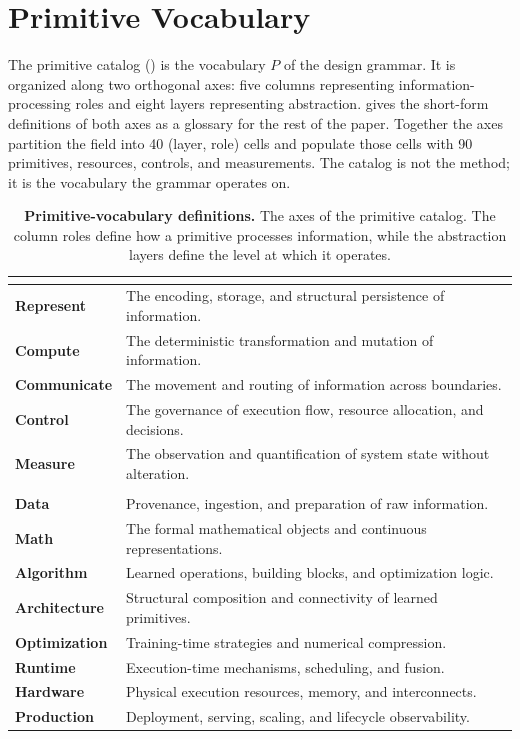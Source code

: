\documentclass[10pt,twocolumn]{article}
\newcommand{\tablebody}{\footnotesize}
\begin{document}
\section{Primitive Vocabulary}
\label{sec:primitive-vocabulary}

The primitive catalog () is the vocabulary $P$ of the design grammar. It is organized along two orthogonal axes: five columns representing information-processing roles and eight layers representing abstraction.  gives the short-form definitions of both axes as a glossary for the rest of the paper. Together the axes partition the field into 40 (layer, role) cells and populate those cells with 90 primitives, resources, controls, and measurements. The catalog is not the method; it is the vocabulary the grammar operates on.

\begin{table}[ht]
\tablebody
\centering
\caption{\textbf{Primitive-vocabulary definitions.} The axes of the primitive catalog. The column roles define how a primitive processes information, while the abstraction layers define the level at which it operates.}
\label{tab:definitions}
\begin{tabularx}{\columnwidth}{@{} >{\bfseries}l X @{}}
\toprule
\multicolumn{2}{@{}l}{\textbf{Information-Processing Roles (Columns)}} \\
\midrule
Represent   & The encoding, storage, and structural persistence of information. \\
Compute     & The deterministic transformation and mutation of information. \\
Communicate & The movement and routing of information across boundaries. \\
Control     & The governance of execution flow, resource allocation, and decisions. \\
Measure     & The observation and quantification of system state without alteration. \\
\midrule
\multicolumn{2}{@{}l}{\textbf{Abstraction Layers}} \\
\midrule
Data         & Provenance, ingestion, and preparation of raw information. \\
Math         & The formal mathematical objects and continuous representations. \\
Algorithm    & Learned operations, building blocks, and optimization logic. \\
Architecture & Structural composition and connectivity of learned primitives. \\
Optimization & Training-time strategies and numerical compression. \\
Runtime      & Execution-time mechanisms, scheduling, and fusion. \\
Hardware     & Physical execution resources, memory, and interconnects. \\
Production   & Deployment, serving, scaling, and lifecycle observability. \\
\bottomrule
\end{tabularx}
\end{table}
\end{document}
